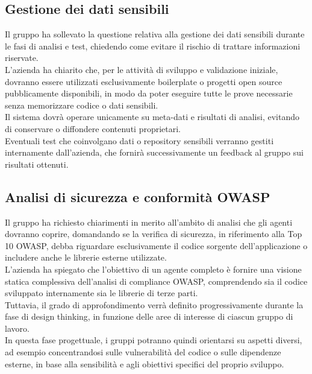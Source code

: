 \subsection{Gestione dei dati sensibili}
Il gruppo ha sollevato la questione relativa alla gestione dei dati sensibili durante le fasi di analisi e test, chiedendo come evitare il rischio di trattare informazioni riservate.\\
L’azienda ha chiarito che, per le attività di sviluppo e validazione iniziale, dovranno essere utilizzati esclusivamente boilerplate o progetti open source pubblicamente disponibili, in modo da poter eseguire tutte le prove necessarie senza memorizzare codice o dati sensibili.\\
Il sistema dovrà operare unicamente su meta-dati e risultati di analisi, evitando di conservare o diffondere contenuti proprietari.\\
Eventuali test che coinvolgano dati o repository sensibili verranno gestiti internamente dall’azienda, che fornirà successivamente un feedback al gruppo sui risultati ottenuti.

\subsection{Analisi di sicurezza e conformità OWASP}
Il gruppo ha richiesto chiarimenti in merito all’ambito di analisi che gli agenti dovranno coprire, domandando se la verifica di sicurezza, in riferimento alla Top 10 OWASP, debba riguardare esclusivamente il codice sorgente dell’applicazione o includere anche le librerie esterne utilizzate.\\
L’azienda ha spiegato che l’obiettivo di un agente completo è fornire una visione statica complessiva dell’analisi di compliance OWASP, comprendendo sia il codice sviluppato internamente sia le librerie di terze parti.\\
Tuttavia, il grado di approfondimento verrà definito progressivamente durante la fase di design thinking, in funzione delle aree di interesse di ciascun gruppo di lavoro.\\
In questa fase progettuale, i gruppi potranno quindi orientarsi su aspetti diversi, ad esempio concentrandosi sulle vulnerabilità del codice o sulle dipendenze esterne, in base alla sensibilità e agli obiettivi specifici del proprio sviluppo.

